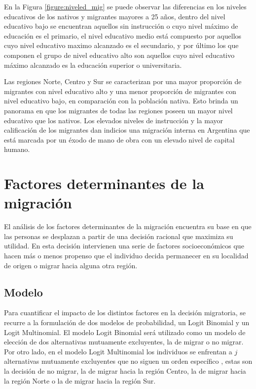 \documentclass[12pt,a4paper]{article}
\begin{document}
En la Figura \ref{figure:niveled_mig} se puede observar las diferencias en los niveles educativos de los nativos y migrantes mayores a 25 años, dentro del nivel educativo bajo se encuentran aquellos sin instrucción o cuyo nivel máximo de educación es el primario, el nivel educativo medio está compuesto por aquellos cuyo nivel educativo maximo alcanzado es el secundario, y por último los que componen el grupo de nivel educativo alto son aquellos cuyo nivel educativo máximo alcanzado es la educación superior o universitaria.

Las regiones Norte, Centro y Sur se caracterizan por una mayor proporción de migrantes con nivel educativo alto y una menor proporción de migrantes con nivel educativo bajo, en comparación con la población nativa. Esto brinda un panorama en que los migrantes de todas las regiones poseen un mayor nivel educativo que los nativos. Los elevados niveles de instrucción y la mayor calificación de los migrantes dan indicios una migración interna en Argentina que está marcada por un éxodo de mano de obra con un elevado nivel de capital humano.


\newpage
\section{Factores determinantes de la migración}
El análisis de los factores determinantes de la migración  encuentra su base en que las personas se desplazan a partir de una decisión racional que maximiza su utilidad. En esta decisión intervienen una serie de factores socioeconómicos que hacen más o menos propenso que el individuo decida permanecer en su localidad de origen o migrar hacia alguna otra región.
\subsection{Modelo}
Para cuantificar el impacto de los distintos factores en la decisión migratoria, se recurre a la formulación de dos modelos de probabilidad, un Logit Binomial y un Logit Multinomial. El modelo Logit Binomial será utilizado como un modelo de elección de dos alternativas mutuamente excluyentes, la de migrar o no migrar. Por otro lado, en el modelo Logit Multinomial los individuos se enfrentan a $j$ alternativas mutuamente excluyentes que no siguen un orden específico \parencite{greene_econometric_2018}, estas son la decisión de no migrar, la de migrar hacia la región Centro, la de migrar hacia la región Norte o la de migrar hacia la región Sur.
\end{document}
